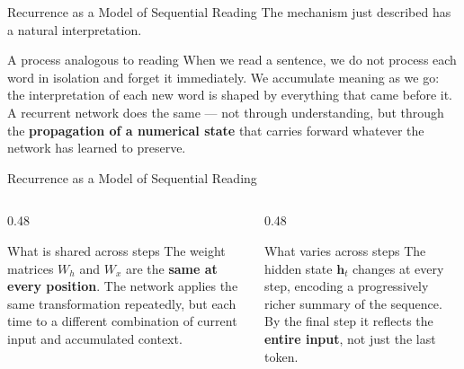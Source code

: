 \documentclass[aspectratio=169]{beamer}
\begin{document}
%
%
\begin{frame}{Recurrence as a Model of Sequential Reading}
The mechanism just described has a natural interpretation.

\vspace{0.15cm}
\begin{block}{A process analogous to reading}
When we read a sentence, we do not process each word
in isolation and forget it immediately.
We accumulate meaning as we go: the interpretation of each new word
is shaped by everything that came before it.
A recurrent network does the same --- not through understanding,
but through the \textbf{propagation of a numerical state}
that carries forward whatever the network has learned to preserve.
\end{block}
\end{frame}
%
%
\begin{frame}{Recurrence as a Model of Sequential Reading}
\vspace{0.2cm}
\begin{columns}[T]
\begin{column}{0.48\textwidth}
\begin{block}{What is shared across steps}
The weight matrices $W_h$ and $W_x$ are the \textbf{same at every position}.
The network applies the same transformation repeatedly,
but each time to a different combination of current input
and accumulated context.
\end{block}
\end{column}
\begin{column}{0.48\textwidth}
\begin{alertblock}{What varies across steps}
The hidden state $\bm{h}_t$ changes at every step,
encoding a progressively richer summary of the sequence.
By the final step it reflects the \textbf{entire input},
not just the last token.
\end{alertblock}
\end{column}
\end{columns}
\end{frame}
%
\end{document}
